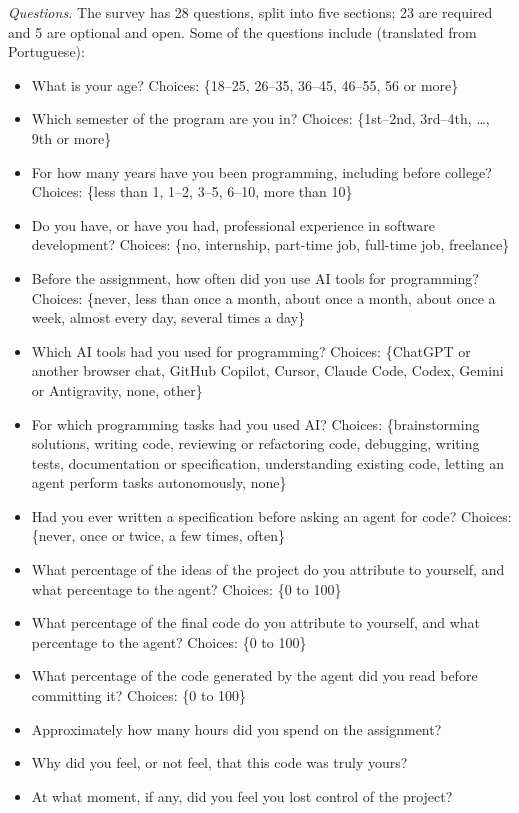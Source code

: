 \documentclass[conference]{IEEEtran}
\begin{document}
\emph{Questions.} The survey has 28 questions, split into five sections; 23 are required and 5 are optional and open. Some of the questions include (translated from Portuguese):
\begin{itemize}
\item[---] What is your age? Choices: \{18--25, 26--35, 36--45, 46--55, 56 or more\}
\item[---] Which semester of the program are you in? Choices: \{1st--2nd, 3rd--4th, \ldots, 9th or more\}
\item[---] For how many years have you been programming, including before college? Choices: \{less than 1, 1--2, 3--5, 6--10, more than 10\}
\item[---] Do you have, or have you had, professional experience in software development? Choices: \{no, internship, part-time job, full-time job, freelance\}
\item[---] Before the assignment, how often did you use AI tools for programming? Choices: \{never, less than once a month, about once a month, about once a week, almost every day, several times a day\}
\item[---] Which AI tools had you used for programming? Choices: \{ChatGPT or another browser chat, GitHub Copilot, Cursor, Claude Code, Codex, Gemini or Antigravity, none, other\}
\item[---] For which programming tasks had you used AI? Choices: \{brainstorming solutions, writing code, reviewing or refactoring code, debugging, writing tests, documentation or specification, understanding existing code, letting an agent perform tasks autonomously, none\}
\item[---] Had you ever written a specification before asking an agent for code? Choices: \{never, once or twice, a few times, often\}
\item[---] What percentage of the ideas of the project do you attribute to yourself, and what percentage to the agent? Choices: \{0 to 100\}
\item[---] What percentage of the final code do you attribute to yourself, and what percentage to the agent? Choices: \{0 to 100\}
\item[---] What percentage of the code generated by the agent did you read before committing it? Choices: \{0 to 100\}
\item[---] Approximately how many hours did you spend on the assignment?
\item[---] Why did you feel, or not feel, that this code was truly yours?
\item[---] At what moment, if any, did you feel you lost control of the project?
\end{itemize}
\end{document}
